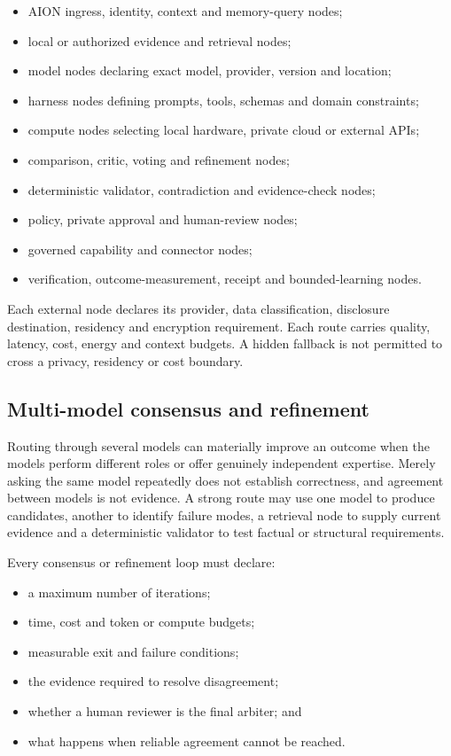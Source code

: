 \begin{itemize}
  \item AION ingress, identity, context and memory-query nodes;
  \item local or authorized evidence and retrieval nodes;
  \item model nodes declaring exact model, provider, version and location;
  \item harness nodes defining prompts, tools, schemas and domain constraints;
  \item compute nodes selecting local hardware, private cloud or external APIs;
  \item comparison, critic, voting and refinement nodes;
  \item deterministic validator, contradiction and evidence-check nodes;
  \item policy, private approval and human-review nodes;
  \item governed capability and connector nodes;
  \item verification, outcome-measurement, receipt and bounded-learning nodes.
\end{itemize}

Each external node declares its provider, data classification, disclosure
destination, residency and encryption requirement.  Each route carries quality,
latency, cost, energy and context budgets.  A hidden fallback is not permitted to
cross a privacy, residency or cost boundary.

\subsection{Multi-model consensus and refinement}

Routing through several models can materially improve an outcome when the models
perform different roles or offer genuinely independent expertise.  Merely asking
the same model repeatedly does not establish correctness, and agreement between
models is not evidence.  A strong route may use one model to produce candidates,
another to identify failure modes, a retrieval node to supply current evidence and
a deterministic validator to test factual or structural requirements.

Every consensus or refinement loop must declare:

\begin{itemize}
  \item a maximum number of iterations;
  \item time, cost and token or compute budgets;
  \item measurable exit and failure conditions;
  \item the evidence required to resolve disagreement;
  \item whether a human reviewer is the final arbiter; and
  \item what happens when reliable agreement cannot be reached.
\end{itemize}

